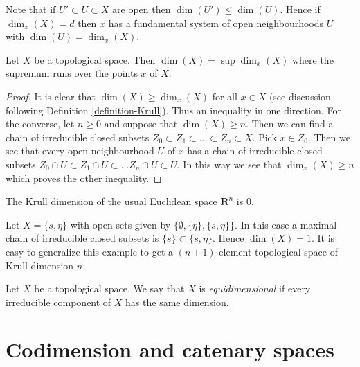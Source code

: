 \noindent
Note that if $U' \subset U \subset X$ are open then
$\dim(U') \leq \dim(U)$. Hence if $\dim_x(X) = d$ then $x$
has a fundamental system of open neighbourhoods $U$ with
$\dim(U) = \dim_x(X)$.

\begin{lemma}
\label{lemma-dimension-supremum-local-dimensions}
Let $X$ be a topological space. Then $\dim(X) = \sup \dim_x(X)$
where the supremum runs over the points $x$ of $X$.
\end{lemma}

\begin{proof}
It is clear that $\dim(X) \geq \dim_x(X)$ for all $x \in X$ (see
discussion following Definition \ref{definition-Krull}).
Thus an inequality in one direction. For the converse, let $n \geq 0$
and suppose that $\dim(X) \geq n$. Then we can find a chain of irreducible
closed subsets $Z_0 \subset Z_1 \subset \ldots \subset Z_n \subset X$.
Pick $x \in Z_0$. Then we see that every open neighbourhood $U$ of $x$
has a chain of irreducible closed subsets
$Z_0 \cap U \subset Z_1 \cap U \subset \ldots Z_n \cap U \subset U$.
In this way we see that $\dim_x(X) \geq n$ which proves the other
inequality.
\end{proof}

\begin{example}
\label{example-Krull-Rn}
The Krull dimension of the usual Euclidean space
$\mathbf{R}^n$ is $0$.
\end{example}

\begin{example}
\label{example-krull-2set}
Let $X = \{s, \eta\}$ with open sets given
by $\{\emptyset, \{\eta\}, \{s, \eta\}\}$.
In this case a maximal chain of irreducible
closed subsets is $\{s\} \subset \{s, \eta\}$.
Hence $\dim(X) = 1$. It is easy to generalize
this example to get a $(n + 1)$-element topological
space of Krull dimension $n$.
\end{example}

\begin{definition}
\label{definition-equidimensional}
Let $X$ be a topological space.
We say that $X$ is {\it equidimensional} if every irreducible
component of $X$ has the same dimension.
\end{definition}





\section{Codimension and catenary spaces}
\label{section-catenary-spaces}

